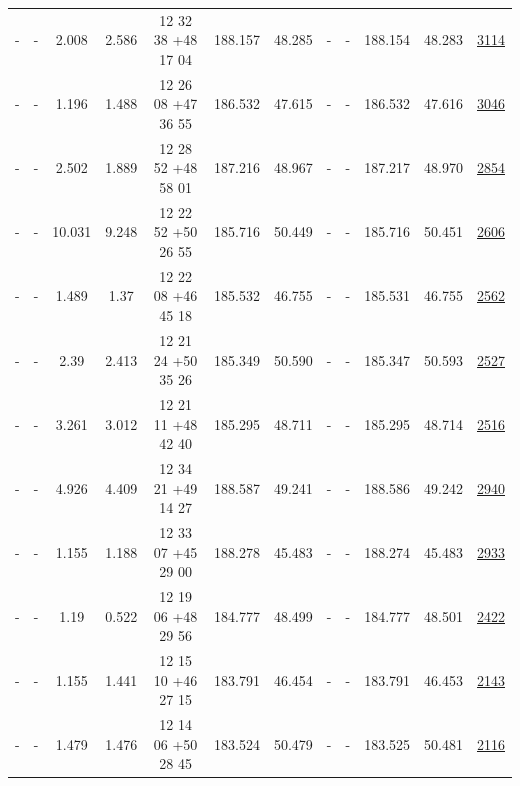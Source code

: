 \documentclass{article}
\begin{document}
\begin{landscape}
\begin{longtable}{c|c|c|c|c|c|c|c|c|c|c|c}
- & - & 2.008 & 2.586 & 12 32 38 +48 17 04 &  188.157 & 48.285 &  - & - & 188.154 & 48.283 & \href{http://banana.transientskp.org/r4/vlo_KmeulenTrap4P23/runningcatalog/3114}{3114}  \\
- & - & 1.196 & 1.488 & 12 26 08 +47 36 55 &  186.532 & 47.615 &  - & - & 186.532 & 47.616 & \href{http://banana.transientskp.org/r4/vlo_KmeulenTrap4P23/runningcatalog/3046}{3046}  \\
- & - & 2.502 & 1.889 & 12 28 52 +48 58 01 &  187.216 & 48.967 &  - & - & 187.217 & 48.970 & \href{http://banana.transientskp.org/r4/vlo_KmeulenTrap4P23/runningcatalog/2854}{2854}  \\
- & - & 10.031 & 9.248 & 12 22 52 +50 26 55 &  185.716 & 50.449 &  - & - & 185.716 & 50.451 & \href{http://banana.transientskp.org/r4/vlo_KmeulenTrap4P23/runningcatalog/2606}{2606}  \\
- & - & 1.489 & 1.37 & 12 22 08 +46 45 18 &  185.532 & 46.755 &  - & - & 185.531 & 46.755 & \href{http://banana.transientskp.org/r4/vlo_KmeulenTrap4P23/runningcatalog/2562}{2562}  \\
- & - & 2.39 & 2.413 & 12 21 24 +50 35 26 &  185.349 & 50.590 &  - & - & 185.347 & 50.593 & \href{http://banana.transientskp.org/r4/vlo_KmeulenTrap4P23/runningcatalog/2527}{2527}  \\
- & - & 3.261 & 3.012 & 12 21 11 +48 42 40 &  185.295 & 48.711 &  - & - & 185.295 & 48.714 & \href{http://banana.transientskp.org/r4/vlo_KmeulenTrap4P23/runningcatalog/2516}{2516}  \\
- & - & 4.926 & 4.409 & 12 34 21 +49 14 27 &  188.587 & 49.241 &  - & - & 188.586 & 49.242 & \href{http://banana.transientskp.org/r4/vlo_KmeulenTrap4P23/runningcatalog/2940}{2940}  \\
- & - & 1.155 & 1.188 & 12 33 07 +45 29 00 &  188.278 & 45.483 &  - & - & 188.274 & 45.483 & \href{http://banana.transientskp.org/r4/vlo_KmeulenTrap4P23/runningcatalog/2933}{2933}  \\
- & - & 1.19 & 0.522 & 12 19 06 +48 29 56 &  184.777 & 48.499 &  - & - & 184.777 & 48.501 & \href{http://banana.transientskp.org/r4/vlo_KmeulenTrap4P23/runningcatalog/2422}{2422}  \\
- & - & 1.155 & 1.441 & 12 15 10 +46 27 15 &  183.791 & 46.454 &  - & - & 183.791 & 46.453 & \href{http://banana.transientskp.org/r4/vlo_KmeulenTrap4P23/runningcatalog/2143}{2143}  \\
- & - & 1.479 & 1.476 & 12 14 06 +50 28 45 &  183.524 & 50.479 &  - & - & 183.525 & 50.481 & \href{http://banana.transientskp.org/r4/vlo_KmeulenTrap4P23/runningcatalog/2116}{2116}  \\

\end{longtable}
\end{landscape}
\end{document}
